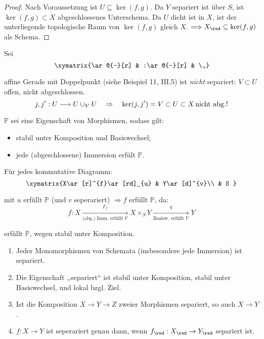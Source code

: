 \begin{proof}
  Nach Voraussetzung ist $U\subseteq\ker(f,g)$. Da $Y$ separiert ist
  über $S$, ist $\ker(f,g)\subset X$ abgeschlossenes Unterschema.
  Da $U$ dicht ist in $X$, ist der unterliegende topologische Raum
  von $\ker(f,g)$ gleich $X$. $\Longrightarrow X_{\red}\subseteq\ker(f,g)$
  als Schema.
\end{proof}
\begin{example}[32]
  Sei
  \[
    \,\xymatrix{\ar@{-}[r] & :\ar@{-}[r] & \,}
  \]

  affine Gerade mit Doppelpunkt (siehe Beispiel 11, III.5) ist \emph{nicht}
  separiert: $V\subset U$ offen, nicht abgeschlossen.
  \[
    j,j':U\longrightarrow U\cup_{V}U\quad\Rightarrow\quad\ker(j,j')=V\subset U\subset X\text{\,nicht abg.!}
  \]
\end{example}

\begin{rem}[33]
  $\mathbb{P}$ sei eine Eigenschaft von Morphismen, sodass gilt:
  \begin{itemize}
  \item stabil unter Komposition und Basiswechsel;
  \item jede (abgeschlossene) Immersion erfült $\mathbb{P}$.
  \end{itemize}
  Für jedes kommutative Diagramm:
  \[
    \xymatrix{X\ar[r]^{f}\ar[rd]_{u} & Y\ar[d]^{v}\\
      & S
    }
  \]

  mit $u$ erfüllt $\mathbb{P}$ (und $v$ seperariert) $\Longrightarrow f$
  erfüllt $\mathbb{P}$, da:
  \[
    f:X\xrightarrow[\text{(abg.) Imm. erfüllt }\mathbb{P}]{\Gamma_{f}}X\times_{S}Y\xrightarrow[\text{Basisw. erfüllt }\mathbb{P}]{q}Y
  \]

  erfüllt $\mathbb{P}$, wegen stabil unter Komposition.
\end{rem}

\begin{prop}[34]
  \mbox{}
  \begin{enumerate}
  \item Jeder Monomorphismsu von Schemata (insbesondere jede Immersion) ist
    separiert.
  \item Die Eigenschaft ,,separiert`` ist stabil unter Komposition, stabil
    unter Basiswechsel, und lokal bzgl. Ziel.
  \item Ist die Komposition $X\rightarrow Y\rightarrow Z$ zweier Morphismen
    separiert, so auch $X\rightarrow Y$.
  \item $f:X\rightarrow Y$ ist seperariert genau dann, wenn $f_{\red}:X_{\red}\rightarrow Y_{\red}$
    separiert ist.
  \end{enumerate}
\end{prop}


